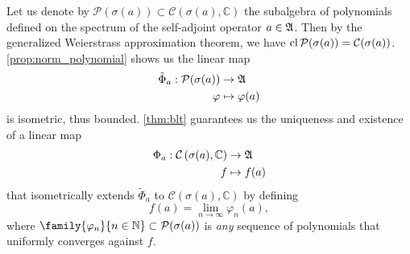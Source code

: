 Let us denote by \(\mathcal{P}(\sigma(a)) \subset \mathcal{C}(\sigma(a), \mathbb{C})\) the subalgebra of polynomials defined on the spectrum of the self-adjoint operator \(a \in \mathfrak{A}\). Then by the generalized Weierstrass approximation theorem, we have \(\operatorname{cl}{\mathcal{P}(\sigma(a))} = \mathcal{C}(\sigma(a))\). \cref{prop:norm_polynomial} shows us the linear map
\begin{align*}
    \tilde{\Phi}_a : \mathcal{P}(\sigma(a)) &\to \mathfrak{A}\\
                                    \varphi &\mapsto \varphi(a)
\end{align*}
is isometric, thus bounded. \cref{thm:blt} guarantees us the uniqueness and existence of a linear map
\begin{align*}
    \Phi_a : \mathcal{C}\left(\sigma(a), \mathbb{C}\right) &\to \mathfrak{A}\\
                                                         f &\mapsto f(a)
\end{align*}
that isometrically extends \(\tilde{\Phi}_a\) to \(\mathcal{C}\left(\sigma(a), \mathbb{C}\right)\) by defining
\begin{equation*}
    f(a) = \lim_{n\to\infty}{\varphi_n(a)},
\end{equation*}
where \(\family{\varphi_n}{n\in \mathbb{N}} \subset \mathcal{P}(\sigma(a))\) is \emph{any} sequence of polynomials that uniformly converges against \(f\).


